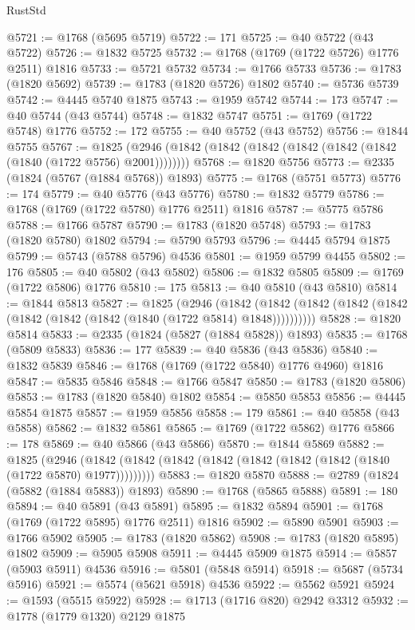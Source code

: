 \begin{lexlean}{RustStd}
\begin{coremodule}
@5721 := @1768 (@5695 @5719)
@5722 := 171
@5725 := @40 @5722 (@43 @5722)
@5726 := @1832 @5725
@5732 := @1768 (@1769 (@1722 @5726) @1776 @2511) @1816
@5733 := @5721 @5732
@5734 := @1766 @5733
@5736 := @1783 (@1820 @5692)
@5739 := @1783 (@1820 @5726) @1802
@5740 := @5736 @5739
@5742 := @4445 @5740 @1875
@5743 := @1959 @5742
@5744 := 173
@5747 := @40 @5744 (@43 @5744)
@5748 := @1832 @5747
@5751 := @1769 (@1722 @5748) @1776
@5752 := 172
@5755 := @40 @5752 (@43 @5752)
@5756 := @1844 @5755
@5767 := @1825 (@2946 (@1842 (@1842 (@1842 (@1842 (@1842 (@1842 (@1840 (@1722 @5756) @2001))))))))
@5768 := @1820 @5756
@5773 := @2335 (@1824 (@5767 (@1884 @5768)) @1893)
@5775 := @1768 (@5751 @5773)
@5776 := 174
@5779 := @40 @5776 (@43 @5776)
@5780 := @1832 @5779
@5786 := @1768 (@1769 (@1722 @5780) @1776 @2511) @1816
@5787 := @5775 @5786
@5788 := @1766 @5787
@5790 := @1783 (@1820 @5748)
@5793 := @1783 (@1820 @5780) @1802
@5794 := @5790 @5793
@5796 := @4445 @5794 @1875
@5799 := @5743 (@5788 @5796) @4536
@5801 := @1959 @5799 @4455
@5802 := 176
@5805 := @40 @5802 (@43 @5802)
@5806 := @1832 @5805
@5809 := @1769 (@1722 @5806) @1776
@5810 := 175
@5813 := @40 @5810 (@43 @5810)
@5814 := @1844 @5813
@5827 := @1825
    (@2946
      (@1842 (@1842 (@1842 (@1842 (@1842 (@1842 (@1842 (@1842 (@1840 (@1722 @5814) @1848))))))))))
@5828 := @1820 @5814
@5833 := @2335 (@1824 (@5827 (@1884 @5828)) @1893)
@5835 := @1768 (@5809 @5833)
@5836 := 177
@5839 := @40 @5836 (@43 @5836)
@5840 := @1832 @5839
@5846 := @1768 (@1769 (@1722 @5840) @1776 @4960) @1816
@5847 := @5835 @5846
@5848 := @1766 @5847
@5850 := @1783 (@1820 @5806)
@5853 := @1783 (@1820 @5840) @1802
@5854 := @5850 @5853
@5856 := @4445 @5854 @1875
@5857 := @1959 @5856
@5858 := 179
@5861 := @40 @5858 (@43 @5858)
@5862 := @1832 @5861
@5865 := @1769 (@1722 @5862) @1776
@5866 := 178
@5869 := @40 @5866 (@43 @5866)
@5870 := @1844 @5869
@5882 := @1825
    (@2946 (@1842 (@1842 (@1842 (@1842 (@1842 (@1842 (@1842 (@1840 (@1722 @5870) @1977)))))))))
@5883 := @1820 @5870
@5888 := @2789 (@1824 (@5882 (@1884 @5883)) @1893)
@5890 := @1768 (@5865 @5888)
@5891 := 180
@5894 := @40 @5891 (@43 @5891)
@5895 := @1832 @5894
@5901 := @1768 (@1769 (@1722 @5895) @1776 @2511) @1816
@5902 := @5890 @5901
@5903 := @1766 @5902
@5905 := @1783 (@1820 @5862)
@5908 := @1783 (@1820 @5895) @1802
@5909 := @5905 @5908
@5911 := @4445 @5909 @1875
@5914 := @5857 (@5903 @5911) @4536
@5916 := @5801 (@5848 @5914)
@5918 := @5687 (@5734 @5916)
@5921 := @5574 (@5621 @5918) @4536
@5922 := @5562 @5921
@5924 := @1593 (@5515 @5922)
@5928 := @1713 (@1716 @820) @2942 @3312
@5932 := @1778 (@1779 @1320) @2129 @1875

\end{coremodule}
\end{lexlean}
